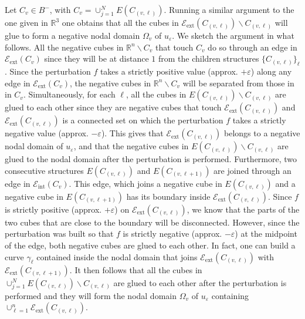 \documentclass[11pt,reqno]{amsart}
\newcommand{\R}{{\mathbb R}}
\newcommand{\ep}{\varepsilon}
\theoremstyle{definition}
\begin{document}
Let $C_v \in B^-$, with $C_v=\cup_{j=1}^N E(C_{(v, \ell)})$. Running a similar argument to the one given in $\R^3$ one obtains that all the cubes in $\mathcal E_{\text{ext}}(C_{(v, \ell)})\backslash C_{(v,\ell)}$  will glue to form a negative nodal domain $\Omega_v$ of $u_\ep$. We sketch the argument in what follows. All the negative cubes  in $\R^n \backslash C_v$ that touch $C_v$ do so through an edge in $\mathcal E_{\text{ext}} (C_v)$ since they will be at distance $1$ from the children structures $\{C_{(v, \ell)}\}_\ell$. Since the perturbation $f$ takes a strictly positive value (approx.  $+\ep$) along any edge in $\mathcal E_{\text{ext}} (C_v)$, the negative cubes  in $\R^n \backslash C_v$ will be separated from those in in $ C_v$.   Simultaneously, for each $\ell$, all the cubes in $E(C_{(v, \ell)}) \backslash C_{(v, \ell)}$ are glued to each other since they are negative cubes that touch $\mathcal E_{\text{ext}}(C_{(v, \ell)})$ and $\mathcal E_{\text{ext}}(C_{(v, \ell)})$ is a connected set on which the perturbation $f$  takes a strictly negative value (approx.  $-\ep$). This gives that $\mathcal E_{\text{ext}}(C_{(v, \ell)})$ belongs to a negative nodal domain of $u_\ep$, and that the negative cubes in $E(C_{(v, \ell)}) \backslash C_{(v, \ell)}$ are glued to the nodal domain after the perturbation is performed. Furthermore, two consecutive structures $E(C_{(v, \ell)}) $ and $E(C_{(v, \ell+1)}) $ are joined through an edge in  $\mathcal E_{\text{int}} (C_v)$.  This edge, which joins a negative cube in $E(C_{(v, \ell)}) $ and a negative cube in $E(C_{(v, \ell+1)}) $ has its boundary inside $\mathcal E_{\text{ext}}(C_{(v, \ell)})$. Since $f$ is strictly positive (approx. $+\ep$) on $\mathcal E_{\text{ext}}(C_{(v, \ell)})$, we know that the parts of the two cubes that are close to the boundary will be disconnected. However, since the perturbation was built so that $f$ is strictly negative  (approx. $-\ep$) at the midpoint of the edge, both negative cubes are glued to each other. In fact, one can build a curve $\gamma_\ell$ contained inside the nodal domain that joins $\mathcal E_{\text{ext}} (C_{(v, \ell)})$ with $\mathcal E_{\text{ext}} (C_{(v, \ell+1)})$. It then follows that all the cubes in  $\cup_{j=1}^N E(C_{(v, \ell)})\backslash C_{(v, \ell)}$ are glued to each other after the perturbation is performed and they will form the nodal domain $\Omega_v$ of $u_\ep$ containing  $\cup_{\ell=1}^n \mathcal E_{\text{ext}}(C_{(v, \ell)})$. 
\end{document}

